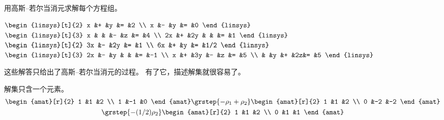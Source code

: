 \begin{exercises}
   \recommended \item 
     用高斯–若尔当消元求解每个方程组。
     \begin{exparts*}
        \partsitem \(
          \begin{linsys}[t]{2}
               x  &+  &y  &=  &2  \\
               x  &-  &y  &=  &0  
          \end{linsys}   \)
        \partsitem \(
          \begin{linsys}[t]{3}
               x  &   &   &-  &z  &=  &4  \\
              2x  &+  &2y &   &   &=  &1  
          \end{linsys}  \)
        \partsitem  \(
           \begin{linsys}[t]{2}
               3x  &-  &2y  &=  &1  \\
               6x  &+  &y   &=  &1/2 
           \end{linsys}  \)
        \partsitem \(
           \begin{linsys}[t]{3}
              2x  &-  &y  &  &  &= &-1  \\
               x  &+  &3y &- &z &= &5   \\
                  &   &y  &+ &2z&= &5   
           \end{linsys} \)
     \end{exparts*}
     \begin{answer}
       这些解答只给出了高斯–若尔当消元的过程。
       有了它，描述解集就很容易了。
       \begin{exparts}
         \partsitem 解集只含一个元素。
           \begin{multline*}
             \begin{amat}[r]{2}
               1  &1  &2  \\
               1  &-1 &0
             \end{amat}
             \grstep{-\rho_1+\rho_2}
             \begin{amat}[r]{2}
               1  &1  &2  \\
               0  &-2 &-2
             \end{amat}                          \\                       
             \grstep{-(1/2)\rho_2}
             \begin{amat}[r]{2}
               1  &1  &2  \\
               0  &1  &1
             \end{amat}                         

\end{multline*}
\end{exparts}
\end{answer}
\end{exercises}
